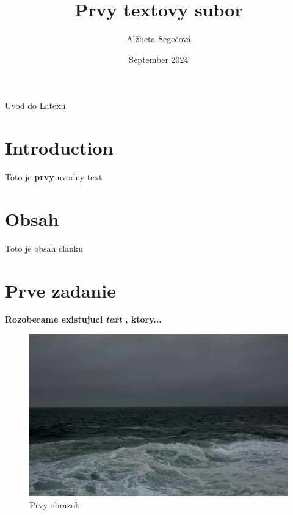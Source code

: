 \documentclass[10pt,letterpaper]{article}
\title{Prvy textovy subor}
\author{Alžbeta Segečová}
\date{September 2024}
\begin{document}
\maketitle
Uvod do Latexu

\section{Introduction}
Toto je \textbf{prvy} uvodny text 

\section{Obsah}
Toto je obsah clanku


\section{Prve zadanie}
\textbf{Rozoberame existujuci \emph{text} , ktory... }

\begin{figure}
    \centering
    \includegraphics[width=0.5\linewidth]{o.jpg}
    \caption{Prvy obrazok}
    \label{fig:enter-label}
\end{figure}
\end{document}
